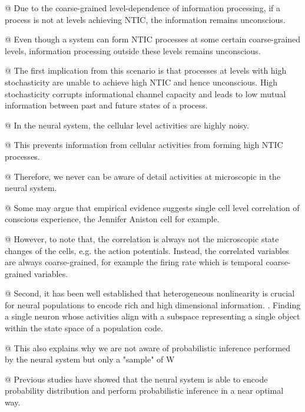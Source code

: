\documentclass[utf8]{article}
\newenvironment{ants}
			{
			 \begin{easylist}[itemize]
		 	}
			{
			\end{easylist}
			} %
\newcommand{\ideaCallout}[1]{\todo[color=Thistle!50!white, size=\small]{#1}}
\begin{document}
            \begin{ants}
                @ Due to the coarse-grained level-dependence of information processing, if a process is not at levels achieving NTIC, the information remains unconscious. 
                
        	    @ Even though a system can form NTIC processes at some certain coarse-grained levels, information processing outside these levels remains unconscious.
        	    
        	    @ The first implication from this scenario is that processes at levels with high stochasticity are unable to achieve high NTIC and hence unconscious. High stochasticity corrupts informational channel capacity and leads to low mutual information between past and future states of a process. 
        	    
        	    @ In the neural system, the cellular level activities are highly noisy. 
        	    
        	    @ This prevents information from cellular activities from forming high NTIC processes.
        	    
        	    @ Therefore, we never can be aware of detail activities at microscopic in the neural system. 
        	    
        	    @ Some may argue that empirical evidence suggests single cell level correlation of conscious experience, the Jennifer Aniston cell for example. 
        	    
        	    @ However, to note that, the correlation is always not the microscopic state changes of the cells, e.g. the action potentials. Instead, the correlated variables are always coarse-grained, for example the firing rate which is temporal coarse-grained variables. 
        	    
        	    @ Second, it has been well established that heterogeneous nonlinearity is crucial for neural populations to encode rich and high dimensional information. \citep{Chelaru2008, Rigotti2010Oct, Shamir2004Jun}. Finding a single neuron whose activities align with a subspace representing a single object within the state space of a population code. \ideaCallout{Not sure if I want to add this point}
        	    
        	    
        	    @ This also explains why we are not aware of probabilistic inference performed by the neural system but only a "sample" of W
        	    
        	    @ Previous studies have showed that the neural system is able to encode probability distribution and perform probabilistic inference in a near optimal way.
        	    

\end{ants}
\end{document}
